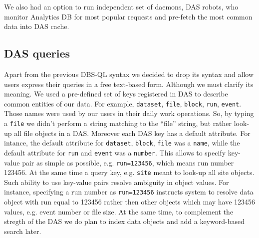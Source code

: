 \documentclass[1p,times]{elsarticle}
\begin{document}
We also had an option to run independent set of daemons, DAS robots, who
monitor Analytics DB for most popular requests and pre-fetch the most
common data into DAS cache. 



\subsection{DAS queries}
Apart from the previous DBS-QL syntax we decided to drop its syntax and allow users
express their queries in a free text-based form. Although we must clarify its
meaning. We used a pre-defined set of keys registered in DAS to describe common
entities of our data. For example, \verb+dataset+, 
\verb+file+, \verb+block+, \verb+run+, \verb+event+. Those
names were used by our users in their daily work operations. So, by typing a
\verb+file+ we didn't perform a string matching to the 
``file'' string, but rather look-up all file objects in a DAS. 
Moreover each DAS key has a default attribute.
For intance, the default attribute for
\verb+dataset+, \verb+block+, \verb+file+ 
was a \verb+name+, while the default attribute for
\verb+run+ and \verb+event+ was a \verb+number+. 
This allows to specify key-value pair as simple as possible, e.g.
\verb+run=123456+, which means run number 123456. At the same time a query 
key, e.g. \verb+site+ meant to look-up all site objects. Such ability
to use key-value pairs resolve ambiguity in object values. For instance,
specifying a run number as \verb+run=123456+ instructs system to resolve
data object with run equal to 123456 rather then other objects which may have
123456 values, e.g. event number or file size. At the same time, to complement
the stregth of the DAS we do plan to index data objects and add a keyword-based 
search later.
\end{document}
